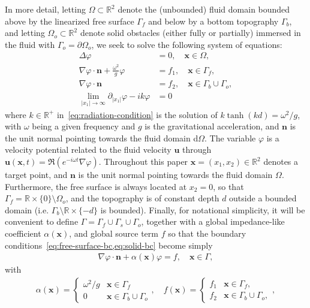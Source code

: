\documentclass[11pt]{article}
\newcommand{\R}{\mathbb{R}}
\newcommand{\bn}{\mathbf{n}}
\newcommand{\bx}{\mathbf{x}}
\begin{document}
In more detail, letting $\Omega \subset \mathbb{R}^2$ denote the (unbounded)
fluid domain bounded above by the linearized free surface $\Gamma_f$ and below
by a bottom topography $\Gamma_b$, and letting $\Omega_o \subset \mathbb{R}^2$
denote solid obstacles (either fully or partially) immersed in the fluid with
$\Gamma_o = \partial \Omega_o$, we seek to solve the following system of equations:
%
\begin{subequations}
  \label{eq:water-waves-system}
  \begin{align}  
    \label{eq:laplace-equation}
    \Delta \varphi &=0, \quad \bx \in \Omega,\\
    \label{eq:free-surface-bc}
    \nabla \varphi \cdot \bn + \frac{\omega^2}{g}\varphi &=f_1, \quad \bx \in \Gamma_f,\\
    \label{eq:solid-bc}  
    \nabla \varphi \cdot \bn &=f_2, \quad \bx \in \Gamma_b \cup \Gamma_o,\\
    \label{eq:radiation-condition}  
    \lim_{|x_1| \to \infty} \partial_{|x_1|} \varphi - i k \varphi  &= 0
  \end{align}
\end{subequations}
%
where $k \in \mathbb{R}^+$ in~\cref{eq:radiation-condition} is the solution of
$k\tanh(kd) = \omega^2/g$, with $\omega$ being a given frequency and $g$ is the
gravitational acceleration, and $\bn$ is the unit normal pointing towards the
fluid domain d$\Omega$. The variable $\varphi$ is a velocity potential related to
the fluid velocity $\boldsymbol{u}$ through $\boldsymbol{u}(\bx,t) = \Re
\left(e^{-i\omega t} \nabla \varphi \right)$.  Throughout this paper $\bx =
(x_1,x_2) \in \R^2$ denotes a target point, and $\bn$ is the unit normal
pointing towards the fluid domain $\Omega$. Furthermore, the free surface is
always located at $x_2 = 0$, so that $\Gamma_f = \R \times \{0\} \setminus
\Omega_o$, and the topography is of constant depth $d$ outside a bounded domain
(i.e. $\Gamma_b \setminus \R \times \{-d\}$ is bounded). Finally, for notational
simplicity, it will be convenient to define $\Gamma = \Gamma_f \cup \Gamma_s
\cup \Gamma_o$, together with a global impedance-like coefficient $\alpha(\bx)$,
and global source term $f$ so that the boundary
conditions~\cref{eq:free-surface-bc,eq:solid-bc} become simply
%
\begin{align}
  \label{eq:global-bc}  
  \nabla \varphi \cdot \bn + \alpha(\bx) \varphi = f, \quad \bx \in \Gamma,
\end{align}
%
with
%
\begin{align}
  \label{eq:global-defs}  
  \alpha(\bx) = \begin{cases}
    \omega^2/g  &\bx \in \Gamma_f\\
    0   &\bx \in \Gamma_b \cup \Gamma_o
  \end{cases}, \quad
  f(\bx) = \begin{cases}
    f_1  &\bx \in \Gamma_f,\\
    f_2  &\bx \in \Gamma_b \cup \Gamma_o,
  \end{cases}, 
\end{align}
% 
\end{document}
